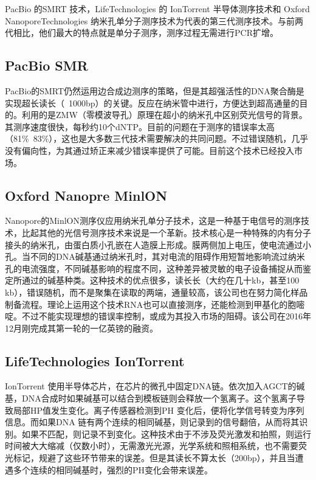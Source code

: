 \documentclass[12pt]{article} %
\begin{document}
PacBio 的SMRT\cite{Paper:Niedringhaus} 技术，LifeTechnologies 的 IonTorrent\cite{Paper:Rothberg} 半导体测序技术和 Oxford NanoporeTechnologies 纳米孔单分子测序技术为代表的第三代测序技术。与前两代相比，他们最大的特点就是单分子测序，测序过程无需进行PCR扩增。




\subsection{PacBio SMR} %
PacBio的SMRT仍然运用边合成边测序的策略，但是其超强活性的DNA聚合酶是实现超长读长（~1000bp）的关键。反应在纳米管中进行，方便达到超高通量的目的。利用的是ZMW（零模波导孔）原理在超小的纳米孔中区别荧光信号的背景。其测序速度很快，每秒约10个dNTP。目前的问题在于测序的错误率太高（81\%~83\%），这也是大多数三代技术需要解决的共同问题。不过错误随机，几乎没有偏向性，为其通过矫正来减少错误率提供了可能。目前这个技术已经投入市场。
\subsection{Oxford Nanopre MinlON} %
Nanopore的MinlON测序仪应用纳米孔单分子技术，这是一种基于电信号的测序技术，比起其他的光信号测序技术来说是一个革新。技术核心是一种特殊的内有分子接头的纳米孔，由蛋白质小孔嵌在人造膜上形成。膜两侧加上电压，使电流通过小孔。当不同的DNA碱基通过纳米孔时，其对电流的阻碍作用短暂地影响流过纳米孔的电流强度，不同碱基影响的程度不同，这种差异被灵敏的电子设备捕捉从而鉴定所通过的碱基种类。这种技术的优点很多，读长长（大约在几十kb，甚至100 kb），错误随机，而不是聚集在读取的两端，通量较高，该公司也在努力简化样品制备流程。理论上运用这个技术RNA也可以直接测序，还能检测到甲基化的胞嘧啶。不过不能实现理想的错误率控制，或成为其投入市场的阻碍。该公司在2016年12月刚完成其第一轮的一亿英镑的融资。
\subsection{LifeTechnologies IonTorrent} %
IonTorrent 使用半导体芯片，在芯片的微孔中固定DNA链。依次加入AGCT的碱基，DNA合成时如果碱基可以结合到模板链则会释放一个氢离子。这个氢离子导致局部HP值发生变化。离子传感器检测到PH 变化后，便将化学信号转变为序列信息。而如果DNA 链有两个连续的相同碱基，则记录到的信号翻倍，从而将其识别。如果不匹配，则记录不到变化。这种技术由于不涉及荧光激发和拍照，则运行时间被大大缩减（仅数小时），无需激光光源，光学系统和照相系统，也不需要荧光标记，规避了这些环节带来的误差。但是其读长不算太长（200bp），并且当遭遇多个连续的相同碱基时，强烈的PH变化会带来误差。
\end{document}
